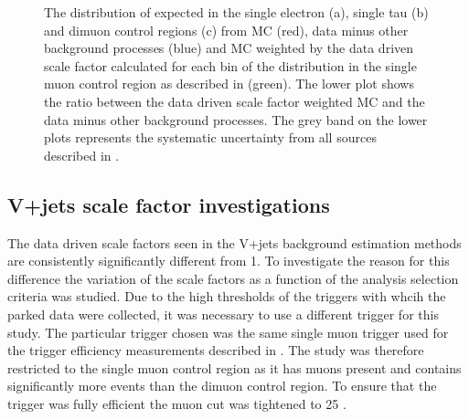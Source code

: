 \begin{figure}
  \caption{The distribution of \METnoMU expected in the single electron (a), single tau (b) and dimuon control regions (c) from \ac{MC} (red), data minus other background processes (blue) and \ac{MC} weighted by the data driven scale factor calculated for each bin of the \METnoMU distribution in the single muon control region as described in  (green). The lower plot shows the ratio between the data driven scale factor weighted \ac{MC} and the data minus other background processes. The grey band on the lower plots represents the systematic uncertainty from all sources described in .}
  \label{fig:parkedclosure}
\end{figure}

\subsection{V+jets scale factor investigations}
\label{sec:parkedscalefactors}
The data driven scale factors seen in the V+jets background estimation methods are consistently significantly different from 1. To investigate the reason for this difference the variation of the scale factors as a function of the analysis selection criteria was studied. Due to the high thresholds of the triggers with whcih the parked data were collected, it was necessary to use a different trigger for this study. The particular trigger chosen was the same single muon trigger used for the trigger efficiency measurements described in . The study was therefore restricted to the single muon control region as it has muons present and contains significantly more events than the dimuon control region. To ensure that the trigger was fully efficient the muon \pt cut was tightened to 25 \GeV.

